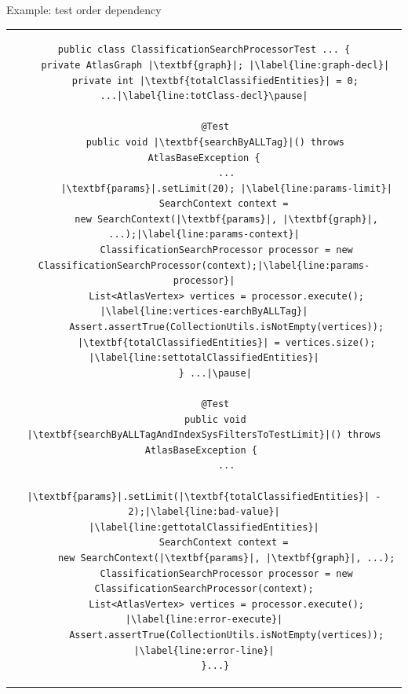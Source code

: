 \documentclass{beamer}
\begin{document}
\begin{frame}[fragile]{Example: test order dependency}
\vspace{-13mm}
\begin{center}
	\begin{table}[h]
		\centering
		\begin{tabular}{c}
\begin{lstlisting}[caption=Test order dependency on the project \texttt{\textbf{Atlas}} (commit\# acb9880).,captionpos=b,label={lst:rq3-example},keywords={totalClassifiedEntities,searchByALLTag,searchByALLTagAndIndexSysFiltersToTestLimit,params,graph},escapechar=|,tabsize=1]
public class ClassificationSearchProcessorTest ... {
	private AtlasGraph |\textbf{graph}|; |\label{line:graph-decl}|
	private int |\textbf{totalClassifiedEntities}| = 0; ...|\label{line:totClass-decl}\pause|
	
	@Test
	public void |\textbf{searchByALLTag}|() throws AtlasBaseException {
		...
		|\textbf{params}|.setLimit(20); |\label{line:params-limit}|
		SearchContext context = 
		new SearchContext(|\textbf{params}|, |\textbf{graph}|, ...);|\label{line:params-context}|
		ClassificationSearchProcessor processor = new ClassificationSearchProcessor(context);|\label{line:params-processor}|
		List<AtlasVertex> vertices = processor.execute(); |\label{line:vertices-earchByALLTag}|
		Assert.assertTrue(CollectionUtils.isNotEmpty(vertices));
		|\textbf{totalClassifiedEntities}| = vertices.size(); |\label{line:settotalClassifiedEntities}|
	} ...|\pause|
	
	@Test
	public void |\textbf{searchByALLTagAndIndexSysFiltersToTestLimit}|() throws AtlasBaseException { 
		...
		|\textbf{params}|.setLimit(|\textbf{totalClassifiedEntities}| - 2);|\label{line:bad-value}| |\label{line:gettotalClassifiedEntities}|
		SearchContext context = 
		new SearchContext(|\textbf{params}|, |\textbf{graph}|, ...);
		ClassificationSearchProcessor processor = new ClassificationSearchProcessor(context);
		List<AtlasVertex> vertices = processor.execute(); |\label{line:error-execute}|
		Assert.assertTrue(CollectionUtils.isNotEmpty(vertices)); |\label{line:error-line}|
	}...}
\end{lstlisting}
		\end{tabular}
		\vspace{-7ex}
	\end{table}
\end{center}
\end{frame}
\end{document}
